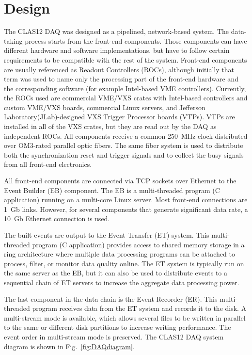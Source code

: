 \section{Design}

The CLAS12 DAQ was designed as a pipelined, network-based system. The data-taking process starts from the
front-end components. Those components can have different hardware and software implementations, but have to
follow certain requirements to be compatible with the rest of the system. Front-end components are usually referenced
as Readout Controllers (ROCs), although initially that term was used to name only the processing part of the front-end
hardware and the corresponding software (for example Intel-based VME controllers). Currently, the ROCs used are
commercial VME/VXS crates with Intel-based controllers and custom VME/VXS boards, commercial Linux servers,
and Jefferson Laboratory(JLab)-designed VXS Trigger Processor boards (VTPs). VTPs are installed in all of the VXS
crates, but they are read out by the DAQ as independent ROCs. All components receive a common 250~MHz clock
distributed over OM3-rated parallel optic fibers. The same fiber system is used to distribute both the synchronization
reset and trigger signals and to collect the busy signals from all front-end electronics.

All front-end components are connected via TCP sockets over Ethernet to the Event Builder (EB) component. The EB is
a multi-threaded program (C application) running on a multi-core Linux server. Most front-end connections are 1~Gb links.
However, for several components that generate significant data rate, a 10~Gb Ethernet connection is used.

The built events are output to the Event Transfer (ET) system. This multi-threaded program (C application) provides
access to shared memory storage in a ring architecture where multiple data processing programs can be attached to
process, filter, or monitor data quality online. The ET system is typically run on the same server as the EB, but it can
also be used to distribute events to a sequential chain of ET servers to increase the aggregate data processing power.

The last component in the data chain is the Event Recorder (ER). This multi-threaded program receives data from the
ET system and records it to the disk. A multi-stream mode is available, which allows several files to be written in parallel
to the same or different disk partitions to increase writing performance. The event order in multi-stream mode is
preserved. The CLAS12 DAQ system diagram is shown in Fig.~\ref{fig:DAQdiagram}.

